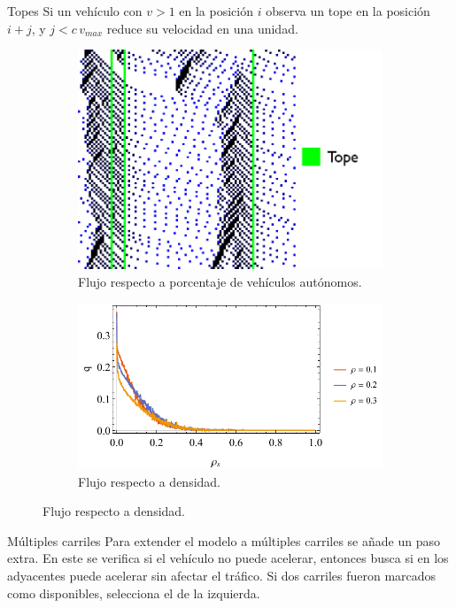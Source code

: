 \documentclass[final]{beamer}
\newlength{\onecolwid}
\newlength{\twocolwid}
\begin{document}
\begin{frame}[t]
\begin{columns}[t]
\begin{column}{\twocolwid}
\begin{columns}[t,totalwidth=\twocolwid]
\begin{column}{\onecolwid}
\begin{block}{Topes}
Si un vehículo con $v > 1$ en la posición $i$ observa un tope en la posición $i+j$, y $j < c \, v_{max}$ reduce su velocidad en una unidad.

\begin{figure}[h!]
\begin{subfigure}{.5\textwidth}
	\centering
	\includegraphics[scale=0.4]{img/tope_ac}
	\caption{Flujo respecto a porcentaje de vehículos autónomos.}
\end{subfigure}%
\begin{subfigure}{.5\textwidth}
	\centering
	\includegraphics[scale=1.2]{img/flow_vs_stop_density}
	\caption{Flujo respecto a densidad.}
\end{subfigure}%
\end{figure}

\end{block}

\begin{block}{Múltiples carriles}
Para extender el modelo a múltiples carriles se añade un paso extra. En este se verifica si el vehículo no puede acelerar, entonces busca si en los adyacentes puede acelerar sin afectar el tráfico. Si dos carriles fueron marcados como disponibles, selecciona el de la izquierda.


\end{block}
\end{column}
\end{columns}
\end{column}
\end{columns}
\end{frame}
\end{document}
